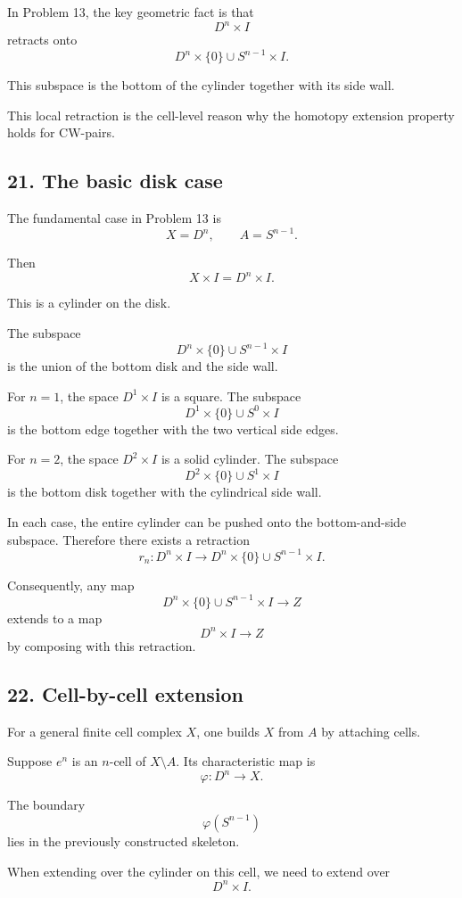 \documentclass[12pt,a4paper]{article}
\theoremstyle{notespace}
\begin{document}
In Problem 13, the key geometric fact is that
\[
D^n\times I
\]
retracts onto
\[
D^n\times\{0\}\cup S^{n-1}\times I.
\]

This subspace is the bottom of the cylinder together with its side wall.

This local retraction is the cell-level reason why the homotopy extension property holds for CW-pairs.

\subsection{21. The basic disk case}

The fundamental case in Problem 13 is
\[
X=D^n,
\qquad
A=S^{n-1}.
\]

Then
\[
X\times I=D^n\times I.
\]

This is a cylinder on the disk.

The subspace
\[
D^n\times\{0\}\cup S^{n-1}\times I
\]
is the union of the bottom disk and the side wall.

For \(n=1\), the space \(D^1\times I\) is a square. The subspace
\[
D^1\times\{0\}\cup S^0\times I
\]
is the bottom edge together with the two vertical side edges.

For \(n=2\), the space \(D^2\times I\) is a solid cylinder. The subspace
\[
D^2\times\{0\}\cup S^1\times I
\]
is the bottom disk together with the cylindrical side wall.

In each case, the entire cylinder can be pushed onto the bottom-and-side subspace. Therefore there exists a retraction
\[
r_n:D^n\times I
\to
D^n\times\{0\}\cup S^{n-1}\times I.
\]

Consequently, any map
\[
D^n\times\{0\}\cup S^{n-1}\times I
\to Z
\]
extends to a map
\[
D^n\times I\to Z
\]
by composing with this retraction.

\subsection*{22. Cell-by-cell extension}

For a general finite cell complex \(X\), one builds \(X\) from \(A\) by attaching cells.

Suppose \(e^n\) is an \(n\)-cell of \(X\setminus A\). Its characteristic map is
\[
\varphi:D^n\to X.
\]

The boundary
\[
\varphi(S^{n-1})
\]
lies in the previously constructed skeleton.

When extending over the cylinder on this cell, we need to extend over
\[
D^n\times I.
\]
\end{document}
